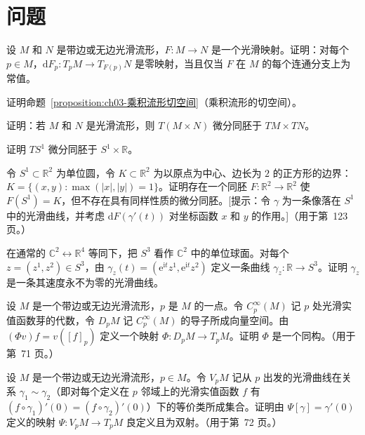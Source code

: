 \documentclass[../../main.tex]{subfiles}
\begin{document}
\section*{问题}\label{section:ch03-问题}

\begin{exercise}\label{exercise:ch03-3-1}
设 $M$ 和 $N$ 是带边或无边光滑流形，$F:M\to N$ 是一个光滑映射。证明：对每个 $p\in M$，$\mathrm{d}F_{p}:T_{p}M\to T_{F(p)}N$ 是零映射，当且仅当 $F$ 在 $M$ 的每个连通分支上为常值。
\end{exercise}

\begin{exercise}\label{exercise:ch03-3-2}
证明命题~\cref{proposition:ch03-乘积流形切空间}（乘积流形的切空间）。
\end{exercise}

\begin{exercise}\label{exercise:ch03-3-3}
证明：若 $M$ 和 $N$ 是光滑流形，则 $T(M\times N)$ 微分同胚于 $TM\times TN$。
\end{exercise}

\begin{exercise}\label{exercise:ch03-3-4}
证明 $TS^{1}$ 微分同胚于 $S^{1}\times\mathbb{R}$。
\end{exercise}

\begin{exercise}\label{exercise:ch03-3-5}
令 $S^{1}\subset\mathbb{R}^{2}$ 为单位圆，令 $K\subset\mathbb{R}^{2}$ 为以原点为中心、边长为 $2$ 的正方形的边界：$K=\{(x,y):\max(|x|,|y|)=1\}$。证明存在一个同胚 $F:\mathbb{R}^{2}\to\mathbb{R}^{2}$ 使 $F(S^{1})=K$，但不存在具有同样性质的微分同胚。[提示：令 $\gamma$ 为一条像落在 $S^{1}$ 中的光滑曲线，并考虑 $\mathrm{d}F(\gamma'(t))$ 对坐标函数 $x$ 和 $y$ 的作用。]（用于第~123 页。）
\end{exercise}

\begin{exercise}\label{exercise:ch03-3-6}
在通常的 $\mathbb{C}^{2}\leftrightarrow\mathbb{R}^{4}$ 等同下，把 $S^{3}$ 看作 $\mathbb{C}^{2}$ 中的单位球面。对每个 $z=(z^{1},z^{2})\in S^{3}$，由 $\gamma_{z}(t)=(\mathrm{e}^{\mathrm{i}t}z^{1},\mathrm{e}^{\mathrm{i}t}z^{2})$ 定义一条曲线 $\gamma_{z}:\mathbb{R}\to S^{3}$。证明 $\gamma_{z}$ 是一条其速度永不为零的光滑曲线。
\end{exercise}

\begin{exercise}\label{exercise:ch03-3-7}
设 $M$ 是一个带边或无边光滑流形，$p$ 是 $M$ 的一点。令 $C^{\infty}_{p}(M)$ 记 $p$ 处光滑实值函数芽的代数，令 $D_{p}M$ 记 $C^{\infty}_{p}(M)$ 的导子所成向量空间。由 $(\Phi v)f=v([f]_{p})$ 定义一个映射 $\Phi:D_{p}M\to T_{p}M$。证明 $\Phi$ 是一个同构。（用于第~71 页。）
\end{exercise}

\begin{exercise}\label{exercise:ch03-3-8}
设 $M$ 是一个带边或无边光滑流形，$p\in M$。令 $V_{p}M$ 记从 $p$ 出发的光滑曲线在关系 $\gamma_{1}\sim\gamma_{2}$（即对每个定义在 $p$ 邻域上的光滑实值函数 $f$ 有 $(f\circ\gamma_{1})'(0)=(f\circ\gamma_{2})'(0)$）下的等价类所成集合。证明由 $\Psi[\gamma]=\gamma'(0)$ 定义的映射 $\Psi:V_{p}M\to T_{p}M$ 良定义且为双射。（用于第~72 页。）
\end{exercise}
\end{document}
